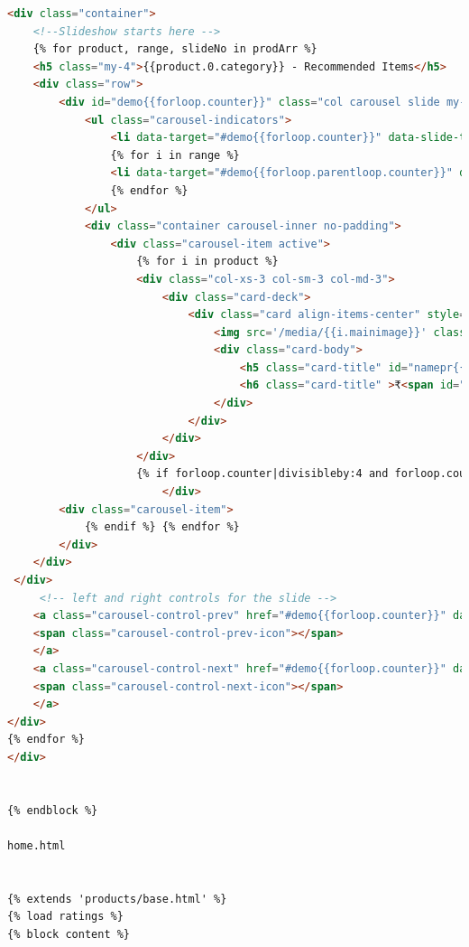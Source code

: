 \documentclass[12pt,a4paper]{report}
\begin{document}
\begin{appendices}
\begin{lstlisting}[language=HTML]
<div class="container">
    <!--Slideshow starts here -->
    {% for product, range, slideNo in prodArr %}
    <h5 class="my-4">{{product.0.category}} - Recommended Items</h5>
    <div class="row">
        <div id="demo{{forloop.counter}}" class="col carousel slide my-3" data-ride="carousel">
            <ul class="carousel-indicators">
                <li data-target="#demo{{forloop.counter}}" data-slide-to="0" class="active"></li>
                {% for i in range %}
                <li data-target="#demo{{forloop.parentloop.counter}}" data-slide-to="{{i}}"></li>
                {% endfor %}
            </ul>
            <div class="container carousel-inner no-padding">
                <div class="carousel-item active">
                    {% for i in product %}
                    <div class="col-xs-3 col-sm-3 col-md-3">
                        <div class="card-deck">
                            <div class="card align-items-center" style="width: 18rem;">
                                <img src='/media/{{i.mainimage}}' class="card-img-top" alt="...">
                                <div class="card-body">
                                    <h5 class="card-title" id="namepr{{i.id}}"><a href="{{ i.get_absolute_url }}">{{i.name}}</a></h5>
                                    <h6 class="card-title" >₹<span id="pricepr{{i.id}}">{{i.price}}</span></h6>
                                </div>
                            </div>
                        </div>
                    </div>
					{% if forloop.counter|divisibleby:4 and forloop.counter > 0 and not forloop.last %}
					    </div>
        <div class="carousel-item">
            {% endif %} {% endfor %}
        </div>
    </div>
 </div>
     <!-- left and right controls for the slide -->
	<a class="carousel-control-prev" href="#demo{{forloop.counter}}" data-slide="prev">
    <span class="carousel-control-prev-icon"></span>
    </a>
	<a class="carousel-control-next" href="#demo{{forloop.counter}}" data-slide="next">
    <span class="carousel-control-next-icon"></span>
    </a>
</div>
{% endfor %}
</div>

 
{% endblock %}

home.html


{% extends 'products/base.html' %}
{% load ratings %}
{% block content %}


\end{lstlisting}
\end{appendices}
\end{document}
